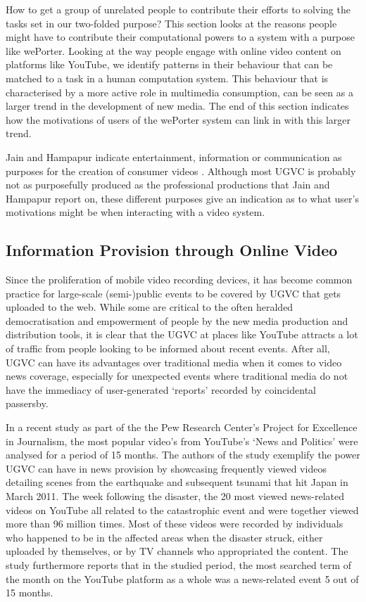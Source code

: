 How to get a group of unrelated people to contribute their efforts to solving the tasks set in our two-folded purpose? This section looks at the reasons people might have to contribute their computational powers to a system with a purpose like wePorter. Looking at the way people engage with online video content on platforms like YouTube, we identify patterns in their behaviour that can be matched to a task in a human computation system. This behaviour that is characterised by a more active role in multimedia consumption, can be seen as a larger trend in the development of new media. The end of this section indicates how the motivations of users of the wePorter system can link in with this larger trend.

Jain and Hampapur indicate entertainment, information or communication as purposes for the creation of consumer videos \cite{Jain:1994we}. Although most UGVC is probably not as purposefully produced as the professional productions that Jain and Hampapur report on, these different purposes give an indication as to what user's motivations might be when interacting with a video system.

\subsection{Information Provision through Online Video}

Since the proliferation of mobile video recording devices, it has become common practice for large-scale (semi-)public events to be covered by UGVC that gets uploaded to the web. While some are critical\cite{Jonsson:2011fh} to the often heralded democratisation and empowerment of people by the new media production and distribution tools, it is clear that the UGVC at places like YouTube attracts a lot of traffic from people looking to be informed about recent events. After all, UGVC can have its advantages over traditional media when it comes to video news coverage, especially for unexpected events where traditional media do not have the immediacy of user-generated `reports' recorded by coincidental passersby. 

In a recent study as part of the the Pew Research Center’s Project for Excellence in Journalism, the most popular video's from YouTube's `News and Politics' were analysed for a period of 15 months\cite{Rosenstiel:2012vb}. The authors of the study exemplify the power UGVC can have in news provision by showcasing frequently viewed videos detailing scenes from the earthquake and subsequent tsunami that hit Japan in March 2011. The week following the disaster, the 20 most viewed news-related videos on YouTube all related to the catastrophic event and were together viewed more than 96 million times. Most of these videos were recorded by individuals who happened to be in the affected areas when the disaster struck, either uploaded by themselves, or by TV channels who appropriated the content. The study furthermore reports that in the studied period, the most searched term of the month on the YouTube platform as a whole was a news-related event 5 out of 15 months.

